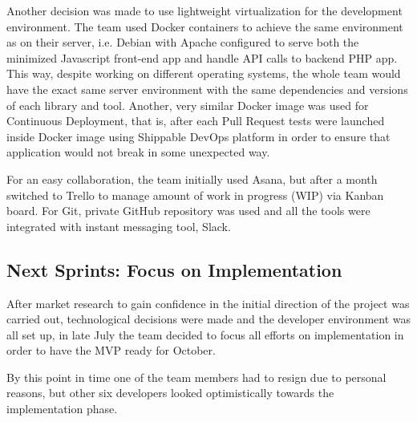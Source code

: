 \documentclass{article}
\begin{document}
Another decision was made to use lightweight virtualization for the development environment. The team used Docker containers to achieve the same environment as on their server, i.e. Debian with Apache configured to serve both the minimized Javascript front-end app and handle API calls to backend PHP app. This way, despite working on different operating systems, the whole team would have the exact same server environment with the same dependencies and versions of each library and tool. Another, very similar Docker image was used for Continuous Deployment, that is, after each Pull Request tests were launched inside Docker image using Shippable DevOps platform in order to ensure that application would not break in some unexpected way.

For an easy collaboration, the team initially used Asana, but after a month switched to Trello to manage amount of work in progress (WIP) via Kanban board. For Git, private GitHub repository was used and all the tools were integrated with instant messaging tool, Slack.

\subsection{Next Sprints: Focus on Implementation}
After market research to gain confidence in the initial direction of the project was carried out, technological decisions were made and the developer environment was all set up, in late July the team decided to focus all efforts on implementation in order to have the MVP ready for October.

By this point in time one of the team members had to resign due to personal reasons, but other six developers looked optimistically towards the implementation phase.
\end{document}
